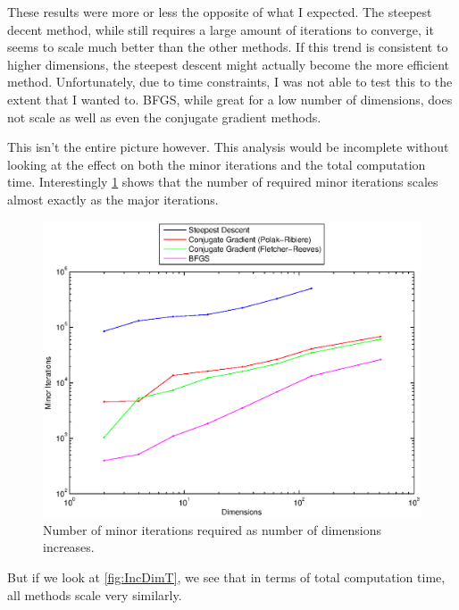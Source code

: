 \documentclass[12pt,parskip=full]{article}
\numberwithin{subsection}{section}
\begin{document}
			These results were more or less the opposite of what I expected. The steepest decent method, while
			still requires a large amount of iterations to converge, it seems to scale much better than the other
			methods. If this trend is consistent to higher dimensions, the steepest descent might actually 
			become the more efficient method. Unfortunately, due to time constraints, I was not able to test
			this to the extent that I wanted to. BFGS, while great for a low number of dimensions, does not 
			scale as well as even the conjugate gradient methods.
			
			This isn't the entire picture however. This analysis would be incomplete without looking at the
			effect on both the minor iterations and the total computation time. Interestingly \cref{fig:IncDimM}
			shows that the number of required minor iterations scales almost exactly as the major iterations.
			
			\begin{figure}[!ht]
				\centering
				\includegraphics[scale=0.5]{DimensionEffectMinor.eps}
				\caption{Number of minor iterations required as number of dimensions increases.\label{fig:IncDimM}}
			\end{figure}
			
			But if we look at \cref{fig:IncDimT}, we see that in terms of total computation time, all methods
			scale very similarly.
			
\end{document}
